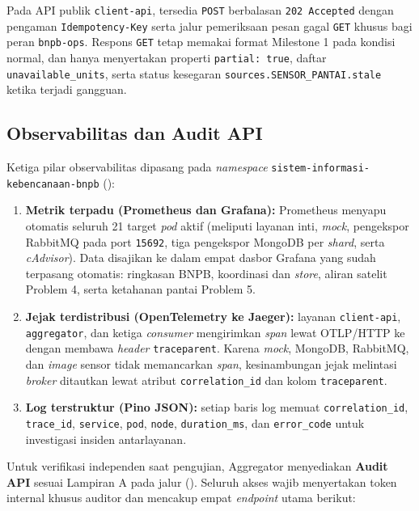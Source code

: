 Pada API publik \texttt{client-api}, tersedia \texttt{POST}  berbalasan \texttt{202 Accepted} dengan pengaman \texttt{Idempotency-Key} serta jalur pemeriksaan pesan gagal \texttt{GET}  khusus bagi peran \texttt{bnpb-ops}. Respons \texttt{GET}  tetap memakai format Milestone 1 pada kondisi normal, dan hanya menyertakan properti \texttt{partial: true}, daftar \texttt{unavailable\_units}, serta status kesegaran \texttt{sources.SENSOR\_PANTAI.stale} ketika terjadi gangguan.

\subsection{Observabilitas dan Audit API}

Ketiga pilar observabilitas dipasang pada \textit{namespace} \texttt{sistem-\allowbreak informasi-\allowbreak kebencanaan-\allowbreak bnpb} ():

\begin{enumerate}
  \item \textbf{Metrik terpadu (Prometheus dan Grafana):} Prometheus menyapu otomatis seluruh 21 target \textit{pod} aktif (meliputi layanan inti, \textit{mock}, pengekspor RabbitMQ pada port \texttt{15692}, tiga pengekspor MongoDB per \textit{shard}, serta \textit{cAdvisor}). Data disajikan ke dalam empat dasbor Grafana yang sudah terpasang otomatis: ringkasan BNPB, koordinasi dan \textit{store}, aliran satelit Problem 4, serta ketahanan pantai Problem 5.
  \item \textbf{Jejak terdistribusi (OpenTelemetry ke Jaeger):} layanan \texttt{client-api}, \texttt{aggregator}, dan ketiga \textit{consumer} mengirimkan \textit{span} lewat OTLP/HTTP ke  dengan membawa \textit{header} \texttt{traceparent}. Karena \textit{mock}, MongoDB, RabbitMQ, dan \textit{image} sensor tidak memancarkan \textit{span}, kesinambungan jejak melintasi \textit{broker} ditautkan lewat atribut \texttt{correlation\_id} dan kolom \texttt{traceparent}.
  \item \textbf{Log terstruktur (Pino JSON):} setiap baris log memuat \texttt{correlation\_id}, \texttt{trace\_id}, \texttt{service}, \texttt{pod}, \texttt{node}, \texttt{duration\_ms}, dan \texttt{error\_code} untuk investigasi insiden antarlayanan.
\end{enumerate}

Untuk verifikasi independen saat pengujian, Aggregator menyediakan \textbf{Audit API} sesuai Lampiran A pada jalur  (). Seluruh akses wajib menyertakan token internal khusus auditor dan mencakup empat \textit{endpoint} utama berikut:

